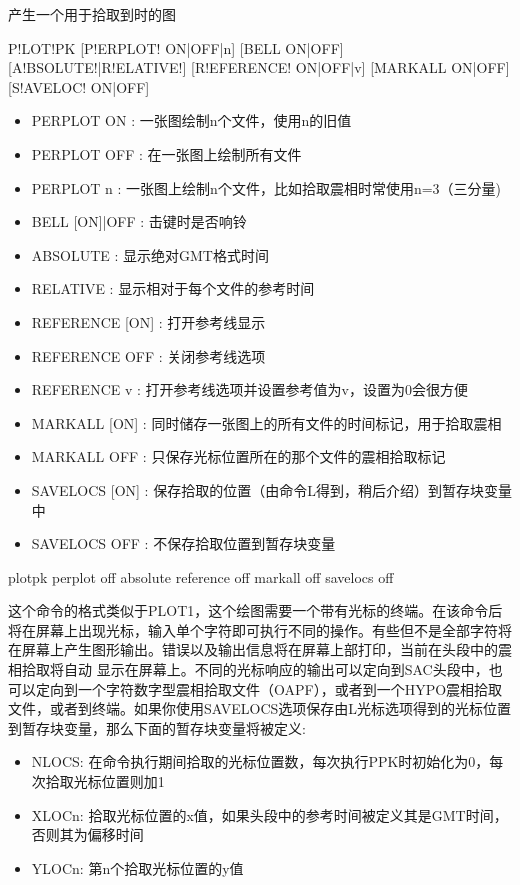 \label{cmd:plotpk}

产生一个用于拾取到时的图

\begin{SACSTX}
P!LOT!PK [P!ERPLOT! ON|OFF|n] [BELL ON|OFF] [A!BSOLUTE!|R!ELATIVE!]
    [R!EFERENCE! ON|OFF|v] [MARKALL ON|OFF] [S!AVELOC! ON|OFF]
\end{SACSTX}

\begin{itemize}
\item PERPLOT ON : 一张图绘制n个文件，使用n的旧值 
\item PERPLOT OFF : 在一张图上绘制所有文件 
\item PERPLOT n : 一张图上绘制n个文件，比如拾取震相时常使用n=3（三分量) 
\item BELL [ON]|OFF :  击键时是否响铃 
\item ABSOLUTE : 显示绝对GMT格式时间 
\item RELATIVE : 显示相对于每个文件的参考时间 
\item REFERENCE [ON] : 打开参考线显示 
\item REFERENCE OFF : 关闭参考线选项 
\item REFERENCE v : 打开参考线选项并设置参考值为v，设置为0会很方便 
\item MARKALL [ON] : 同时储存一张图上的所有文件的时间标记，用于拾取震相 
\item MARKALL OFF : 只保存光标位置所在的那个文件的震相拾取标记 
\item SAVELOCS [ON] : 保存拾取的位置（由命令L得到，稍后介绍）到暂存块变量中 
\item SAVELOCS OFF :  不保存拾取位置到暂存块变量 
\end{itemize}

\begin{SACDFT}
plotpk perplot off absolute reference off markall off savelocs off
\end{SACDFT}

这个命令的格式类似于PLOT1，这个绘图需要一个带有光标的终端。在该命令后将在屏幕上出现光标，输入单个字符即可执行不同的操作。有些但不是全部字符将在屏幕上产生图形输出。错误以及输出信息将在屏幕上部打印，当前在头段中的震相拾取将自动	显示在屏幕上。不同的光标响应的输出可以定向到SAC头段中，也可以定向到一个字符数字型震相拾取文件（OAPF），或者到一个HYPO震相拾取文件，或者到终端。如果你使用SAVELOCS选项保存由L光标选项得到的光标位置到暂存块变量，那么下面的暂存块变量将被定义:
\begin{itemize}
\item NLOCS: 在命令执行期间拾取的光标位置数，每次执行PPK时初始化为0，每次拾取光标位置则加1
\item XLOCn: 拾取光标位置的x值，如果头段中的参考时间被定义其是GMT时间，否则其为偏移时间
\item YLOCn: 第n个拾取光标位置的y值
\end{itemize}


